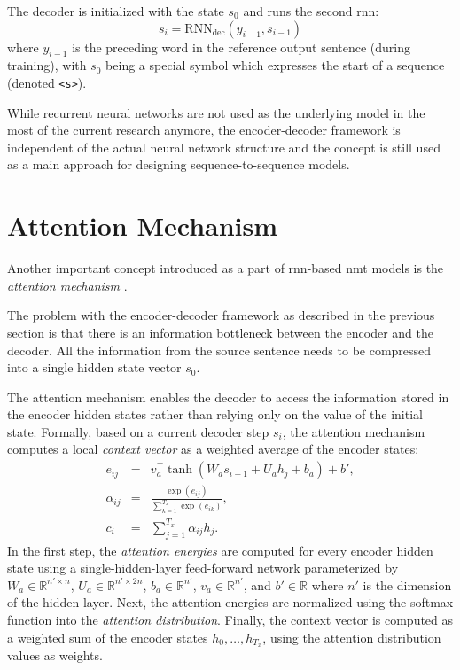 The decoder is initialized with the state $s_0$ and runs the second \gls{rnn}:
\begin{equation} s_i = \mathrm{RNN}_{\text{dec}}(y_{i-1}, s_{i-1})
\end{equation}
%
where $y_{i-1}$ is the preceding word in the reference output sentence (during
training), with $s_0$ being a special symbol which expresses the start of a
sequence (denoted \texttt{<s>}).

While recurrent neural networks are not used as the underlying model in the most
of the current research anymore, the encoder-decoder framework is independent of
the actual neural network structure and the concept is still used as a main
approach for designing sequence-to-sequence models.

\section{Attention Mechanism}
\label{sec:attention}

Another important concept introduced as a part of \gls{rnn}-based \gls{nmt}
models is the \emph{attention mechanism}
\citep{bahdanau2014neural,luong2015effective}.

The problem with the encoder-decoder framework as described in the previous
section is that there is an information bottleneck between the encoder and the
decoder. All the information from the source sentence needs to be compressed
into a single hidden state vector $s_0$.

The attention mechanism enables the decoder to access the information stored in
the encoder hidden states rather than relying only on the value of the initial
state.  Formally, based on a current decoder step $s_i$, the attention mechanism
computes a local \emph{context vector} as a weighted average of the encoder
states:
%
\begin{eqnarray}
  e_{ij} & = & v_a^\top \tanh (W_a s_{i-1} + U_a h_j + b_a) + b', \label{eq:attn-energies} \\
  \alpha_{ij} & = & \frac{\exp(e_{ij})}{\sum_{k=1}^{T_x}\exp(e_{ik})}, \\
  c_i & = & \sum_{j=1}^{T_x} \alpha_{ij} h_j.
\end{eqnarray}
%
In the first step, the \emph{attention energies} are computed for every encoder
hidden state using a single-hidden-layer feed-forward network parameterized by
$W_a \in \mathbb{R}^{n' \times n}$, $U_a \in \mathbb{R}^{n' \times 2n}$,
$b_a \in \mathbb{R}^{n'}$, $v_a \in \mathbb{R}^{n'}$, and $b' \in \mathbb{R}$
where $n'$ is the dimension of the hidden layer. Next, the attention energies
are normalized using the softmax function into the \emph{attention
  distribution}.  Finally, the context vector is computed as a weighted sum of
the encoder states $h_0,\ldots, h_{T_x}$, using the attention distribution
values as weights.

